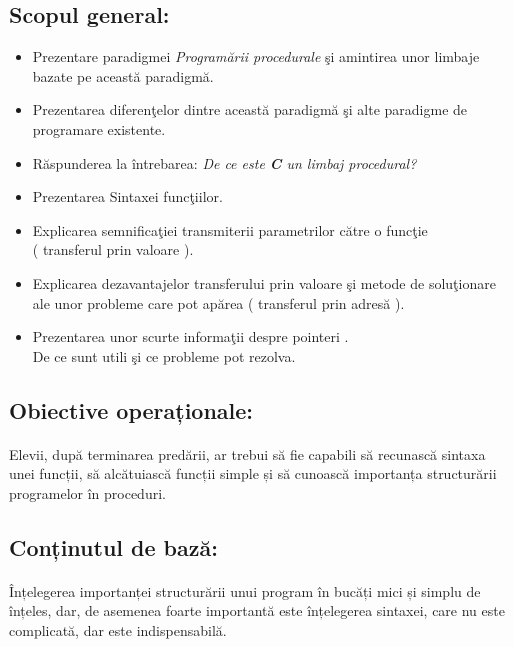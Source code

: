 \documentclass{article}
\begin{document}
	\subsection{Scopul general:}
		\begin{itemize}[label={-}]
			
			\item Prezentare paradigmei \textit{Program\u arii procedurale} \c si amintirea unor limbaje bazate pe aceast\u a paradigm\u a.

			\item Prezentarea diferen\c telor dintre aceast\u a paradigm\u a \c si alte paradigme de programare existente.

			\item R\u aspunderea la \^ intrebarea: \textit{ De ce este \textbf{C} un limbaj procedural?}

			\item Prezentarea Sintaxei func\c tiilor.

			\item Explicarea semnifica\c tiei transmiterii parametrilor c\u atre o func\c tie\\ ( transferul prin valoare ).

			\item Explicarea dezavantajelor transferului prin valoare \c si metode de solu\c tionare ale unor probleme care pot ap\u area ( transferul prin adres\u a ).

			\item Prezentarea unor scurte informa\c tii despre pointeri .\\ De ce sunt utili \c si ce probleme pot rezolva.


		\end{itemize}
	\subsection{Obiective operaționale:}
		\paragraph{}Elevii, după terminarea predării, ar trebui să fie capabili să recunască sintaxa unei funcții, să alcătuiască funcții simple și să 
cunoască importanța structurării programelor în proceduri.

	\subsection{Conținutul de bază:}
		\paragraph{}Înțelegerea importanței structurării unui program în bucăți mici și simplu de înțeles, dar, de asemenea foarte importantă este înțelegerea sintaxei, care nu este complicată, dar este indispensabilă.
	
\end{document}

